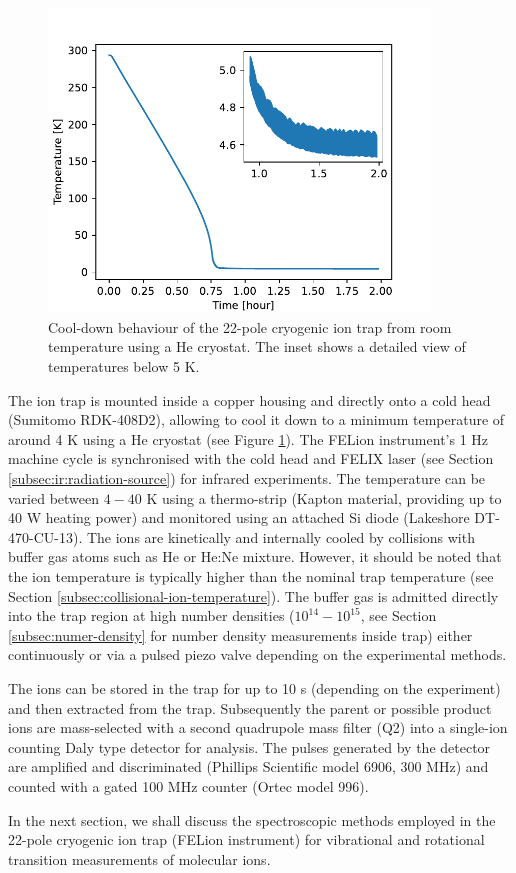 \begin{figure}[!b]
    \centering
    \includegraphics[width=0.9\textwidth]{figures/Instruments/cooldown-behaviour.pdf}
    \caption{Cool-down behaviour of the 22-pole cryogenic ion trap from room temperature using a He cryostat. The inset shows a detailed view of temperatures below 5 K.}
    \label{fig:cooldown_behaviour}
\end{figure}

The ion trap is mounted inside a copper housing and directly onto a cold head (Sumitomo RDK-408D2), allowing to cool it down to a minimum temperature of around 4 K using a He cryostat (see Figure \ref{fig:cooldown_behaviour}). The FELion instrument's 1 Hz machine cycle is synchronised with the cold head and FELIX laser (see Section \ref{subsec:ir:radiation-source}) for infrared experiments. The temperature can be varied between $4-40$ K using a thermo-strip (Kapton material, providing up to 40 W heating power) and monitored using an attached Si diode (Lakeshore DT-470-CU-13). The ions are kinetically and internally cooled by collisions with buffer gas atoms such as He or He:Ne mixture. However, it should be noted that the ion temperature is typically higher than the nominal trap temperature \cite{endres_incomplete_2017} (see Section \ref{subsec:collisional-ion-temperature}). The buffer gas is admitted directly into the trap region at high number densities ($10^{14}-10^{15}$\percc, see Section \ref{subsec:numer-density} for number density measurements inside trap) either continuously or via a pulsed piezo valve depending on the experimental methods. 

The ions can be stored in the trap for up to 10 s (depending on the experiment) and then extracted from the trap. Subsequently the parent or possible product ions are mass-selected with a second quadrupole mass filter (Q2) into a single-ion counting Daly type detector \cite{daly_scintillation_1960} for analysis. The pulses generated by the detector are amplified and discriminated (Phillips Scientific model 6906, 300 MHz) and counted with a gated 100 MHz counter (Ortec model 996).

In the next section, we shall discuss the spectroscopic methods employed in the 22-pole cryogenic ion trap (FELion instrument) for vibrational and rotational transition measurements of molecular ions.
